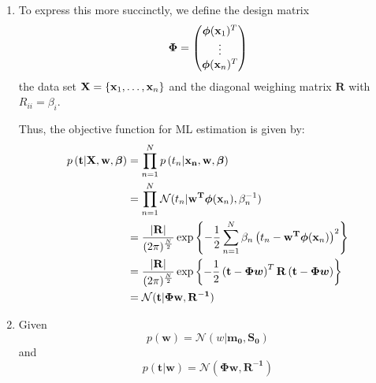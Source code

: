 \documentclass[reqno]{amsart}
\begin{document}
\begin{enumerate}[label=\textbf{(\Roman*)}]
        \solution
        \begin{enumerate}[label=\textbf{(\alph*)}]
            \item To express this more succinctly, we define the design matrix \[\boldsymbol{\Phi} = \begin{pmatrix}\boldsymbol{\phi}(\mathbf{x}_1)^T \\ \vdots \\ \boldsymbol{\phi}(\mathbf{x}_n)^T\end{pmatrix} \]
            the data set \(\mathbf{X} = \left\{\mathbf{x}_1, \ldots, \mathbf{x}_{n}\right\}\)
            and the diagonal weighing matrix \(\mathbf{R}\) with \(R_{ii} = \beta_i\).
            
            Thus, the objective function for ML estimation is given by:
            \begin{align}
                \begin{split}
                    p\left({\mathbf{t}} \middle| {\mathbf{X}, \mathbf{w}, \boldsymbol{\beta}}\right)  
                    &= \prod_{n = 1}^{N} p\left(t_n | \mathbf{x_n}, \mathbf{w}, \boldsymbol{\beta}\right) \\
                    &= \prod_{n = 1}^{N} \mathcal{N} (t_n | \mathbf{w^T} \boldsymbol{\phi}(\mathbf{x}_n), \beta_n^{-1}) \\
                    &= \frac{\left|\mathbf{R}\right|}{(2\pi)^{\frac{N}{2}}}\exp \left\{- \frac{1}{2} \sum_{n = 1}^{N} \beta_n \left(t_n - \mathbf{w^T} \boldsymbol{\phi}(\mathbf{x}_n)\right)^2\right\} \\
                    &= \frac{\left|\mathbf{R}\right|}{(2\pi)^{\frac{N}{2}}} \exp \left\{- \frac{1}{2} \left(\mathbf{t} - \boldsymbol{\Phi w}\right)^T \mathbf{R} \left(\mathbf{t} - \boldsymbol{\Phi w}\right)\right\} \\
                    &= \mathcal{N} (\mathbf{t}|\mathbf{\Phi w, R^{-1}}) \label{eq:ml} 
                \end{split}
            \end{align}
            \item 
                Given
                    \[p(\mathbf{w}) = \mathcal{N}(w|\mathbf{m_0, S_0})\]
                and
                    \[p(\mathbf{t|w}) = \mathcal{N}(\mathbf{\Phi w, R^{-1}})\]


\end{enumerate}
\end{enumerate}
\end{document}
